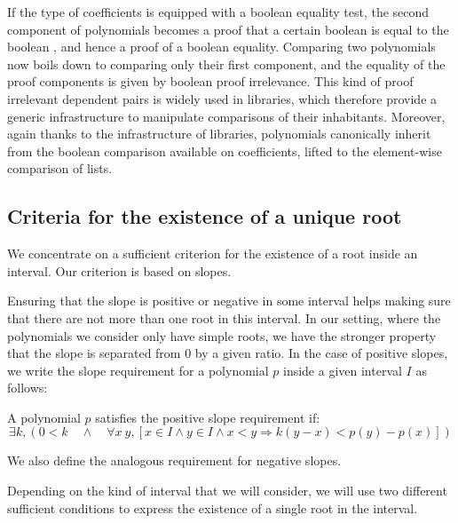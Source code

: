 \documentclass{mscs}
\begin{document}
If the type  of coefficients is equipped with a
boolean equality test, the second component of polynomials becomes a
proof that a certain boolean is equal to the boolean , and
hence a proof of a boolean equality. Comparing two polynomials now
boils down to comparing only their first component, and the equality
of the proof components is given by boolean proof irrelevance.
This kind of proof irrelevant dependent pairs is widely used in \ssr{}
libraries, which therefore provide a generic infrastructure to
manipulate comparisons of their inhabitants. Moreover, again thanks
to the infrastructure of \ssr{} libraries, polynomials
canonically inherit from the boolean comparison available on
coefficients, lifted to the element-wise comparison of lists.


\subsection{Criteria for the existence of a unique root}
\label{sec:criteria}
We concentrate on a sufficient criterion for the existence of a root
inside an interval.  %
Our criterion is based on slopes.

Ensuring that the slope is positive or negative in some interval helps
making sure that there are not more than one root in this interval.  In our
setting, where the polynomials we consider only have simple roots, we
have the stronger
property that the slope is separated from 0 by a given ratio.  In the
case of positive slopes, we write the slope requirement for a
polynomial \(p\) inside a given interval \(I\) as follows:
\begin{definition}
A polynomial $p$ satisfies the positive slope requirement if:
\[\exists k, (0 < k \quad \wedge \quad \forall x\ y, [x \in I \wedge y \in I
\wedge x < y \Rightarrow k(y - x) < p(y) - p (x)]) \]
\end{definition}
We also define the analogous requirement for negative slopes.

Depending on the kind of interval that we will consider, we will use
two different sufficient conditions to express the existence of a
single root in the interval.
\end{document}
